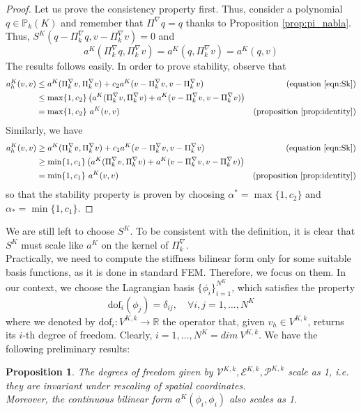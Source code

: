 \documentclass[10pt]{article}
\newcommand{\dof}{\text{dof}}
\newtheorem{prop}{Proposition}
\begin{document}
\begin{proof}
	Let us prove the consistency property first. Thus, consider a polynomial $q \in \mathbb{P}_k(K)$ and remember that $\Pi^\nabla q = q$ thanks to Proposition \ref{prop:pi_nabla}. Thus, $S^K(q-\Pi_k^\nabla q, v-\Pi_k^\nabla v)=0$ and $$a^K(\Pi_k^\nabla q, \Pi_k^\nabla v)=a^K(q, \Pi_k^\nabla v)=a^K(q,v)$$ The results follows easily.
	In order to prove stability, observe that
	\begin{align*}
	a_h^K(v,v) &\leq a^K(\Pi_k^\nabla v, \Pi_k^\nabla v)+c_2 a^K(v-\Pi_k^\nabla v, v-\Pi_k^\nabla v)
	& \text{(equation \eqref{eqn:Sk})}\\
	&\leq \max \lbrace 1,c_2 \rbrace \left( a^K(\Pi_k^\nabla v, \Pi_k^\nabla v)+a^K(v-\Pi_k^\nabla v, v-\Pi_k^\nabla v) \right)\\
	&= \max \lbrace 1,c_2 \rbrace \ a^K(v,v)  & \text{(proposition \ref{prop:identity})}\\
	\end{align*}
	Similarly, we have
	\begin{align*}
	a_h^K(v,v) &\geq a^K(\Pi_k^\nabla v, \Pi_k^\nabla v)+c_1 a^K(v-\Pi_k^\nabla v, v-\Pi_k^\nabla v)
	& \text{(equation \eqref{eqn:Sk})}\\
	&\geq \min \lbrace 1,c_1 \rbrace \left( a^K(\Pi_k^\nabla v, \Pi_k^\nabla v)+a^K(v-\Pi_k^\nabla v, v-\Pi_k^\nabla v) \right)\\
	&= \min \lbrace 1,c_1 \rbrace \ a^K(v,v)  & \text{(proposition \ref{prop:identity})}\\
	\end{align*}
	so that the stability property is proven by choosing $\alpha^*=\max \lbrace 1,c_2 \rbrace$ and $\alpha_*=\min \lbrace 1,c_1 \rbrace$.
\end{proof}
We are still left to choose $S^K$. To be consistent with the definition, it is clear that $S^K$ must scale like $a^K$ on the kernel of $\Pi_k^\nabla$. \\
Practically, we need to compute the stiffness bilinear form only for some suitable basis functions, as it is done in standard FEM. Therefore, we focus on them. In our context, we choose the Lagrangian basis $\lbrace \phi_i \rbrace_{i=1}^{N^K}$, which satisfies the property
$$\dof_i(\phi_j)=\delta_{ij}, \quad \forall i,j=1,\dots,N^K$$ 
where we denoted by $\dof_i:V^{K,k}\rightarrow \mathbb{R}$ the operator that, given $v_h \in V^{K,k}$, returns its $i$-th degree of freedom. Clearly, $i=1,\dots,N^K=dim \ V^{K,k}$.
We have the following preliminary results: \\
\begin{prop}
	The degrees of freedom given by $\mathcal{V}^{K,k},\mathcal{E}^{K,k},\mathcal{P}^{K,k}$ scale as 1, i.e. they are invariant under rescaling of spatial coordinates. \\
	Moreover, the continuous bilinear form $a^K(\phi_i,\phi_i)$ also scales as 1.
	\label{prop:scaling}
\end{prop}
\end{document}
